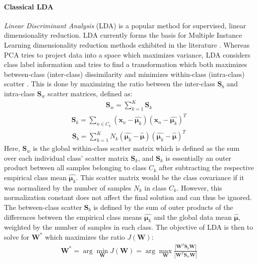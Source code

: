 \paragraph{Classical LDA}
\textit{Linear Discriminant Analysis} (LDA) is a popular method for supervised, linear dimensionality reduction.  LDA currently forms the basis for Multiple Instance Learning dimensionality reduction methods exhibited in the literature \citep{Sun2010MIDR,Chai2014MIDA,Zhu2018MIDRSparsity,Xu2011MI_Metric_Learning}. Whereas PCA tries to project data into a space which maximizes variance, LDA considers class label information and tries to find a transformation which both maximizes between-class (inter-class) dissimilarity and minimizes within-class (intra-class) scatter \citep{Yan2007GeneralGraphEmbeddingFramework,Chao2019RecentAdvancesSupervisedDimRed, Sun2010MIDR, Murphy2012}.   This is done by maximizing the ratio between the inter-class $\bm{S}_{b}$ and intra-class $\bm{S}_{w}$ scatter matrices, defined as:
\begin{align}
	\bm{S}_{w} = \sum_{k=1}^{K}\bm{S}_{k}
\end{align}
\begin{align}
	\bm{S}_{k} = \sum_{n \in C_{k}}(\bm{x}_{n} - \hat{\bm{\mu}_{k}})(\bm{x}_{n} - \hat{\bm{\mu}_{k}})^{T}
\end{align}
\begin{align}
	\bm{S}_{b} = \sum_{k=1}^{K}N_{k}(\hat{\bm{\mu}_{k}} - \hat{\bm{\mu}})(\hat{\bm{\mu}_{k}} - \hat{\bm{\mu}})^{T}
\end{align}
\noindent
Here, $\bm{S}_{w}$ is the global within-class scatter matrix which is defined as the sum over each individual class' scatter matrix $\bm{S}_{k}$, and $\bm{S}_{k}$ is essentially an outer product between all samples belonging to class $C_{k}$ after subtracting the respective empirical class mean $\hat{\bm{\mu}_{k}}$.  This scatter matrix would be the class covariance if it was normalized by the number of samples $N_{k}$ in class $C_{k}$.  However, this normalization constant does not affect the final solution and can thus be ignored.  The between-class scatter $\bm{S}_{b}$ is defined by the sum of outer products of the differences between the empirical class means $\hat{\bm{\mu}_{k}}$ and the global data mean $\hat{\bm{\mu}}$, weighted by the number of samples in each class.  The objective of LDA is then to solve for $\bm{W}^{*}$ which maximizes the ratio $J(\bm{W})$:
\begin{align}
	\bm{W}^{*} = \arg\min_{\bm{W}} J(\bm{W}) =  \arg\max_{\bm{W}} \frac{|\bm{W}^{T}\bm{S}_{b}\bm{W}|}{|\bm{W}^{T}\bm{S}_{w}\bm{W}|}
\end{align}
